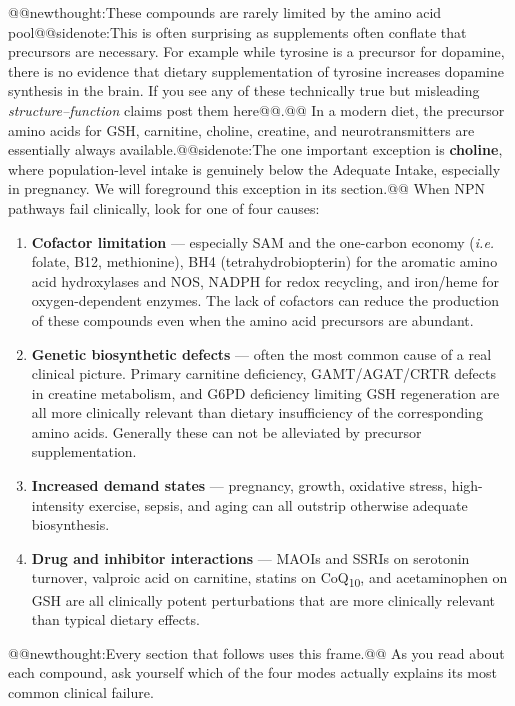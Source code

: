 \documentclass{tufte-handout}
\makeatletter
\def\newthought#1{@@newthought:#1@@}
\def\sidenote#1{@@sidenote:#1@@}
\makeatother
\begin{document}
\newthought{These compounds are rarely limited by the amino acid pool\sidenote{This is often surprising as supplements often conflate that precursors are necessary. For example while tyrosine is a precursor for dopamine, there is no evidence that dietary supplementation of tyrosine increases dopamine synthesis in the brain.  If you see any of these technically true but misleading \emph{structure--function} claims post them here}.} In a modern diet, the precursor amino acids for GSH, carnitine, choline, creatine, and neurotransmitters are essentially always available.\sidenote{The one important exception is \textbf{choline}, where population-level intake is genuinely below the Adequate Intake, especially in pregnancy. We will foreground this exception in its section.} When NPN pathways fail clinically, look for one of four causes:

\begin{enumerate}
\item \textbf{Cofactor limitation} --- especially SAM and the one-carbon economy (\textit{i.e.} folate, B12, methionine), BH4 (tetrahydrobiopterin) for the aromatic amino acid hydroxylases and NOS, NADPH for redox recycling, and iron/heme for oxygen-dependent enzymes.  The lack of cofactors can reduce the production of these compounds even when the amino acid precursors are abundant.
\item \textbf{Genetic biosynthetic defects} --- often the most common cause of a real clinical picture. Primary carnitine deficiency, GAMT/AGAT/CRTR defects in creatine metabolism, and G6PD deficiency limiting GSH regeneration are all more clinically relevant than dietary insufficiency of the corresponding amino acids.  Generally these can not be alleviated by precursor supplementation.
\item \textbf{Increased demand states} --- pregnancy, growth, oxidative stress, high-intensity exercise, sepsis, and aging can all outstrip otherwise adequate biosynthesis.
\item \textbf{Drug and inhibitor interactions} --- MAOIs and SSRIs on serotonin turnover, valproic acid on carnitine, statins on CoQ\textsubscript{10}, and acetaminophen on GSH are all clinically potent perturbations that are more clinically relevant than typical dietary effects.
\end{enumerate}

\newthought{Every section that follows uses this frame.} As you read about each compound, ask yourself which of the four modes actually explains its most common clinical failure.
\end{document}
